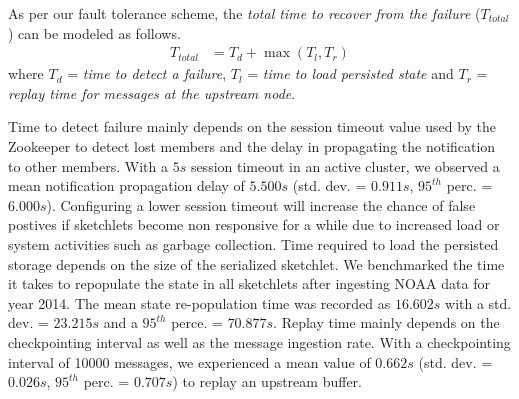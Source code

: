 As per our fault tolerance scheme, the \textit{total time to recover from the failure} ($T_{total}$) can be modeled as follows.
\begin{align*}
    T_{total} &= T_{d} + \max{(T_{l}, T_{r})}      
\end{align*}
where $T_{d}$ = \textit{time to detect a failure}, $T_{l}$ = \textit{time to load persisted state} and $T_{r}$ = \textit{replay time for messages at the upstream node}.

Time to detect failure mainly depends on the session timeout value used by the Zookeeper to detect lost members and the delay in propagating the notification to other members. With a $5s$ session timeout in an active cluster, we observed a mean notification propagation delay of $5.500s$ (std. dev. = $0.911s$, $95^{th}$ perc. = $6.000s$). Configuring a lower session timeout will increase the chance of false postives if sketchlets become non responsive for a while due to increased load or system activities such as garbage collection. Time required to load the persisted storage depends on the size of the serialized sketchlet. We benchmarked the time it takes to repopulate the state in all sketchlets after ingesting NOAA data for year 2014. The mean state re-population time was recorded as $16.602s$ with a std. dev. = $23.215s$ and a $95^{th}$ perce. = $70.877s$. Replay time mainly depends on the checkpointing interval as well as the message ingestion rate. With a checkpointing interval of 10000 messages, we experienced a mean value of $0.662s$ (std. dev. = $0.026s$, $95^{th}$ perc. = $0.707s$) to replay an upstream buffer.  														


